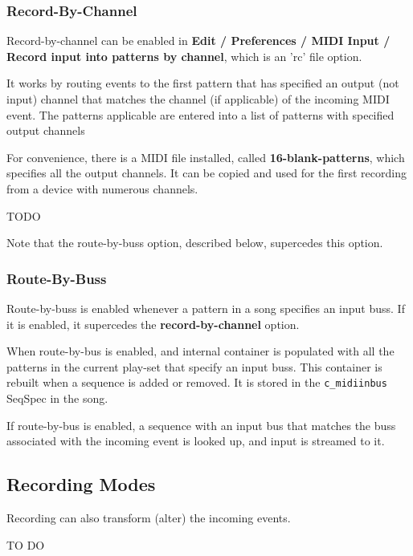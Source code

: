 \subsubsection{Record-By-Channel}
\label{subsubsec:recording_record_by_channel}

   Record-by-channel can be enabled in
   \textbf{Edit / Preferences / MIDI Input / Record input into patterns by
   channel}, which is an 'rc' file option.

   It works by routing events to the first pattern that has specified an 
   output (not input) channel that matches the channel (if applicable) of
   the incoming MIDI event.
   The patterns applicable are entered into a list of patterns with specified
   output channels

   For convenience, there is a MIDI file installed, called
   \textbf{16-blank-patterns}, which specifies all the output channels.
   It can be copied and used for the first recording from a device
   with numerous channels.

   TODO

   Note that the route-by-buss option, described below, supercedes this
   option.

\subsubsection{Route-By-Buss}
\label{subsubsec:recording_route_by_buss}

   Route-by-buss is enabled whenever a pattern in a song specifies an
   input buss.
   If it is enabled, it supercedes the
   \textbf{record-by-channel} option.

   When route-by-bus is enabled, and internal container is populated with
   all the patterns in the current play-set that specify an input buss.
   This container is rebuilt when a sequence is added or removed.
   It is stored in the \texttt{c\_midiinbus} SeqSpec in the song.

   If route-by-bus is enabled, a sequence with an input bus that matches the
   buss associated with the incoming event is looked up, and input is
   streamed to it.

\subsection{Recording Modes}
\label{sec:recording_modes}

   Recording can also transform (alter) the incoming events.

   TO DO


